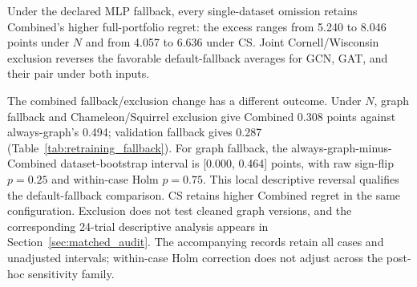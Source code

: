 Under the declared MLP fallback, every single-dataset omission retains Combined's higher full-portfolio regret: the excess ranges from 5.240 to 8.046 points under $N$ and from 4.057 to 6.636 under CS. Joint Cornell/Wisconsin exclusion reverses the favorable default-fallback averages for GCN, GAT, and their pair under both inputs.

The combined fallback/exclusion change has a different outcome. Under $N$, graph fallback and Chameleon/Squirrel exclusion give Combined 0.308 points against always-graph's 0.494; validation fallback gives 0.287 (Table~\ref{tab:retraining_fallback}). For graph fallback, the always-graph-minus-Combined dataset-bootstrap interval is [0.000, 0.464] points, with raw sign-flip $p=0.25$ and within-case Holm $p=0.75$. This local descriptive reversal qualifies the default-fallback comparison. CS retains higher Combined regret in the same configuration. Exclusion does not test cleaned graph versions, and the corresponding 24-trial descriptive analysis appears in Section~\ref{sec:matched_audit}. The accompanying records retain all cases and unadjusted intervals; within-case Holm correction does not adjust across the post-hoc sensitivity family.
